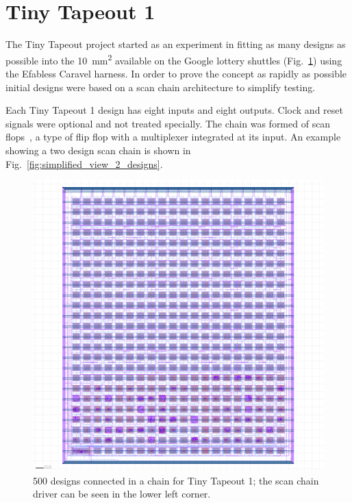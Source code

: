 \section{Tiny Tapeout 1}
\label{sec:tinytapeout1}

The Tiny Tapeout project started as an experiment in fitting as many designs as possible into the \qty{10}{\milli\meter\squared} available on the Google lottery shuttles (Fig.~\ref{fig:500_designs_chain_TT01}) using the Efabless Caravel harness.
In order to prove the concept as rapidly as possible initial designs were based on a scan chain architecture to simplify testing.

Each Tiny Tapeout 1 design has eight inputs and eight outputs.
Clock and reset signals were optional and not treated specially. The chain was formed of scan flops~\cite{skywaterpdk}, a type of flip flop with a multiplexer integrated at its input. An example showing a two design scan chain is shown in Fig.~\ref{fig:simplified_view_2_designs}.

\begin{figure}[!t]
\centering
\includegraphics[width=1\columnwidth]{./Figs/tt01_whole_die.png}
\caption{500 designs connected in a chain for Tiny Tapeout 1; the scan chain driver can be seen in the lower left corner.}
\label{fig:500_designs_chain_TT01}
\end{figure}

